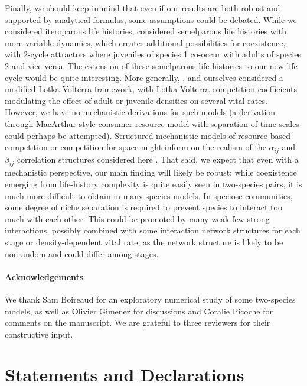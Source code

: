 \documentclass{article}
\begin{document}
Finally, we should keep in mind that even if our results are both robust and supported by analytical formulas, some assumptions could be debated. While we considered iteroparous life histories, \citet{cushing2007coexistence} considered semelparous life histories with more variable dynamics, which creates additional possibilities for coexistence, with 2-cycle attractors where juveniles of species 1 co-occur with adults of species 2 and vice versa. The extension of these semelparous life histories to our new life cycle would be quite interesting. More generally, \citet{cushing2007coexistence}, \citet{moll2008competition} and ourselves considered a modified Lotka-Volterra framework, with Lotka-Volterra competition coefficients modulating the effect of adult or juvenile densities on several vital rates. However, we have no mechanistic derivations for such models (a derivation through MacArthur-style consumer-resource model with separation of time scales could perhaps be attempted).
Structured mechanistic models of resource-based competition or competition for space might inform on the realism of the $\alpha_{ij}$ and $\beta_{ij}$ correlation structures considered here \citep{goldberg1991competitive, loreau1994competitive, tillman1982resource, qi2021coexistence}. That said, we expect that even with a mechanistic perspective, our main finding will likely be robust: while coexistence emerging from life-history complexity is quite easily seen in two-species pairs, it is much more difficult to obtain in many-species models. In speciose communities, some degree of niche separation is required to prevent species to interact too much with each other. This could be promoted by many weak-few strong interactions, possibly combined with some interaction network structures for each stage \citep[e.g.][]{kinlockuncovering}  or density-dependent vital rate, as the network structure is likely to be nonrandom and could differ among stages.

\paragraph{Acknowledgements}
We thank Sam Boireaud for an exploratory numerical study of some two-species models, as well as Olivier Gimenez for discussions and Coralie Picoche for comments on the manuscript. We are grateful to three reviewers for their constructive input.

\section*{Statements and Declarations}
\end{document}
